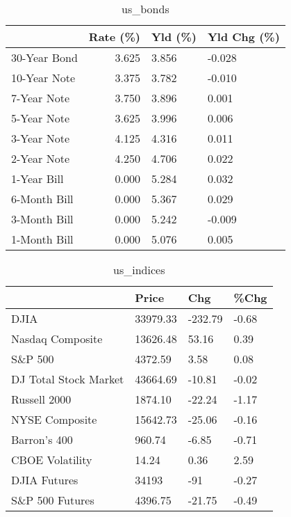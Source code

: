 \documentclass{article}%
\begin{document}
\begin{table}[htbp]%
\caption{us\_bonds}%
\centering%
\begin{adjustbox}{width=1\textwidth}%
\begin{tabular}{lrll}
\toprule
             &  Rate (\%) & Yld (\%) & Yld Chg (\%) \\
\midrule
30-Year Bond &     3.625 &   3.856 &      -0.028 \\
10-Year Note &     3.375 &   3.782 &      -0.010 \\
 7-Year Note &     3.750 &   3.896 &       0.001 \\
 5-Year Note &     3.625 &   3.996 &       0.006 \\
 3-Year Note &     4.125 &   4.316 &       0.011 \\
 2-Year Note &     4.250 &   4.706 &       0.022 \\
 1-Year Bill &     0.000 &   5.284 &       0.032 \\
6-Month Bill &     0.000 &   5.367 &       0.029 \\
3-Month Bill &     0.000 &   5.242 &      -0.009 \\
1-Month Bill &     0.000 &   5.076 &       0.005 \\
\bottomrule
\end{tabular}
%
\end{adjustbox}%
\end{table}

%


\begin{table}[htbp]%
\caption{us\_indices}%
\centering%
\begin{adjustbox}{width=1\textwidth}%
\begin{tabular}{llll}
\toprule
                      &    Price &     Chg &  \%Chg \\
\midrule
                 DJIA & 33979.33 & -232.79 & -0.68 \\
     Nasdaq Composite & 13626.48 &   53.16 &  0.39 \\
              S\&P 500 &  4372.59 &    3.58 &  0.08 \\
DJ Total Stock Market & 43664.69 &  -10.81 & -0.02 \\
         Russell 2000 &  1874.10 &  -22.24 & -1.17 \\
       NYSE Composite & 15642.73 &  -25.06 & -0.16 \\
         Barron's 400 &   960.74 &   -6.85 & -0.71 \\
      CBOE Volatility &    14.24 &    0.36 &  2.59 \\
         DJIA Futures &    34193 &     -91 & -0.27 \\
      S\&P 500 Futures &  4396.75 &  -21.75 & -0.49 \\
\bottomrule
\end{tabular}
%
\end{adjustbox}%
\end{table}
\end{document}
